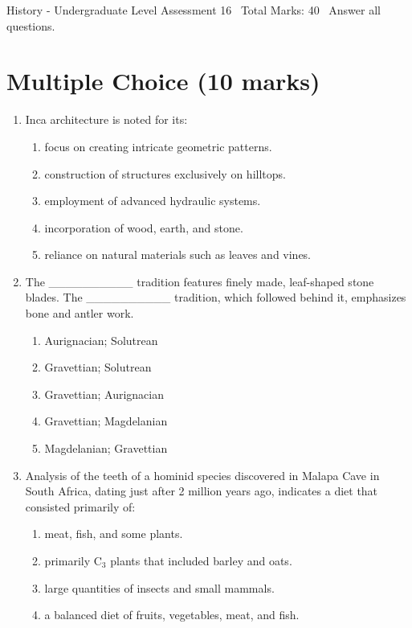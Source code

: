 \documentclass[12pt]{article}
\begin{document}
\begin{center}
History - Undergraduate Level Assessment 16 \
Total Marks: 40 \
Answer all questions.
\end{center}

\section*{Multiple Choice (10 marks)}
\begin{enumerate}[label=\arabic*.]
\item Inca architecture is noted for its:
\begin{enumerate}[label=(\alph*)]
    \item focus on creating intricate geometric patterns.
    \item construction of structures exclusively on hilltops.
    \item employment of advanced hydraulic systems.
    \item incorporation of wood, earth, and stone.
    \item reliance on natural materials such as leaves and vines.
\end{enumerate}
\item The \_\_\_\_\_\_\_\_\_\_ tradition features finely made, leaf-shaped stone blades. The \_\_\_\_\_\_\_\_\_\_ tradition, which followed behind it, emphasizes bone and antler work.
\begin{enumerate}[label=(\alph*)]
    \item Aurignacian; Solutrean
    \item Gravettian; Solutrean
    \item Gravettian; Aurignacian
    \item Gravettian; Magdelanian
    \item Magdelanian; Gravettian
\end{enumerate}
\item Analysis of the teeth of a hominid species discovered in Malapa Cave in South Africa, dating just after 2 million years ago, indicates a diet that consisted primarily of:
\begin{enumerate}[label=(\alph*)]
    \item meat, fish, and some plants.
    \item primarily C$_{3}$ plants that included barley and oats.
    \item large quantities of insects and small mammals.
    \item a balanced diet of fruits, vegetables, meat, and fish.

\end{enumerate}
\end{enumerate}
\end{document}
